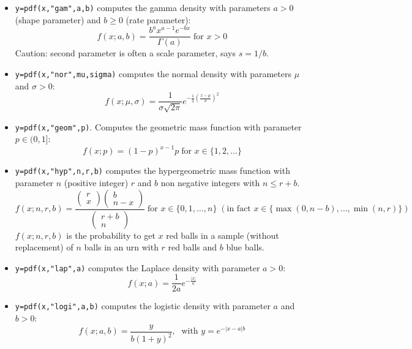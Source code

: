 \begin{mandescription}
\begin{itemize}
\item {} \verb!y=pdf(x,"gam",a,b)! computes the gamma
  density with parameters $a > 0$ (shape parameter) and $b \ge 0$
  (rate parameter):
$$
     f(x; a, b) = \frac{ b^a x^{a-1} e^{-bx} } {\Gamma(a)}\; \mbox{for } x > 0
$$
Caution: second parameter is often a scale parameter, says $s = 1/b$.

\item {} \verb!y=pdf(x,"nor",mu,sigma)! computes the normal
  density with parameters $\mu$ and $\sigma > 0$:
$$
     f(x; \mu, \sigma) = \frac{ 1 }{ \sigma \sqrt{2\pi}}
     e^{-\frac{1}{2} \left( \frac{x-\mu}{\sigma} \right)^2 }
$$


\item {} \verb!y=pdf(x,"geom",p)!. Computes
  the geometric mass function with parameter $p \in (0,1]$:
$$
     f(x; p) = (1-p)^{x-1} p \;\mbox{for } x \in \{1, 2, \dots\}
$$

\item {} \verb!y=pdf(x,"hyp",n,r,b)! computes
  the hypergeometric mass function with parameter $n$ (positive
  integer) $r$ and $b$ non negative integers with $n \le r + b$. 
$$
     f(x; n, r,b) = 
    \frac{\left(\begin{array}{c}r\\x\end{array}\right)
          \left(\begin{array}{c}b\\n-x\end{array}\right)}
         {\left(\begin{array}{c}r+b\\n\end{array}\right)}
         \;\mbox{for } x \in \{0, 1, \dots, n\} \; (\mbox{in fact }x \in \{\max(0,n-b),\dots, \min(n,r)\})
$$
$f(x; n,r,b)$ is the probability to get $x$ red balls
in a sample (without replacement) of $n$ balls in an urn
with $r$ red balls and $b$ blue balls.


\item {} \verb!y=pdf(x,"lap",a)! computes the Laplace
  density with parameter $a > 0$:
$$
     f(x; a) = \frac{1}{2a} e^{-\frac{|x|}{a}}
$$

\item {} \verb!y=pdf(x,"logi",a,b)! computes the logistic
  density with parameter $a$ and $b > 0$:
$$
     f(x; a,b) = \frac{y}{b (1+y)^2}, \; \mbox{ with } y = e^{-{|x-a|}{b}}
$$



\end{itemize}
\end{mandescription}
